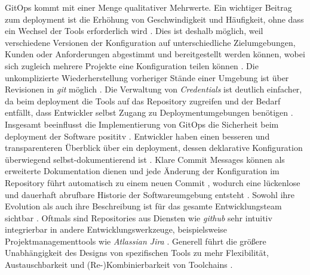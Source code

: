GitOps kommt mit einer Menge qualitativer Mehrwerte. Ein wichtiger Beitrag zum \Gls{deployment} ist die Erhöhung von Geschwindigkeit und Häufigkeit, ohne dass ein Wechsel der Tools erforderlich wird \cite{008:GitOps-Approach-to-Cloud-Cluster-System-Deployment,109:GitOps}. Dies ist deshalb möglich, weil verschiedene Versionen der Konfiguration auf unterschiedliche Zielumgebungen, Kunden oder Anforderungen abgestimmt und bereitgestellt werden können, wobei sich zugleich mehrere Projekte eine Konfiguration teilen können \cite{008:GitOps-Approach-to-Cloud-Cluster-System-Deployment}. Die unkomplizierte Wiederherstellung vorheriger Stände einer Umgebung ist über Revisionen in \textit{\Gls{git}} möglich \cite{008:GitOps-Approach-to-Cloud-Cluster-System-Deployment,010:Efficient-Application-Deployment-GitOps-for-Faster-and-Secure-CI-CD-Cycles,109:GitOps}. Die Verwaltung von \textit{Credentials} ist deutlich einfacher, da beim \Gls{deployment} die Tools auf das Repository zugreifen \cite{008:GitOps-Approach-to-Cloud-Cluster-System-Deployment,109:GitOps} und der Bedarf entfällt, dass Entwickler selbst Zugang zu Deploymentumgebungen benötigen \cite{010:Efficient-Application-Deployment-GitOps-for-Faster-and-Secure-CI-CD-Cycles}. Insgesamt beeinflusst die Implementierung von GitOps die Sicherheit beim \Gls{deployment} der Software posititv \cite{008:GitOps-Approach-to-Cloud-Cluster-System-Deployment,010:Efficient-Application-Deployment-GitOps-for-Faster-and-Secure-CI-CD-Cycles,109:GitOps}. Entwickler haben einen besseren und transparenteren Überblick über ein \Gls{deployment}, dessen deklarative Konfiguration überwiegend selbst-dokumentierend ist \cite{008:GitOps-Approach-to-Cloud-Cluster-System-Deployment,109:GitOps}. Klare Commit Messages können als erweiterte Dokumentation dienen \cite{008:GitOps-Approach-to-Cloud-Cluster-System-Deployment} und jede Änderung der Konfiguration im Repository führt automatisch zu einem neuen Commit \cite{010:Efficient-Application-Deployment-GitOps-for-Faster-and-Secure-CI-CD-Cycles}, wodurch eine lückenlose und dauerhaft abrufbare Historie der Softwareumgebung entsteht \cite{008:GitOps-Approach-to-Cloud-Cluster-System-Deployment,010:Efficient-Application-Deployment-GitOps-for-Faster-and-Secure-CI-CD-Cycles,109:GitOps}. Sowohl ihre Evolution als auch ihre Beschreibung ist für das gesamte Entwicklungsteam sichtbar \cite{109:GitOps}. Oftmals sind Repositories aus Diensten wie \textit{\Gls{github}} sehr intuitiv integrierbar in andere Entwicklungswerkzeuge, beispielsweise Projektmanagementtools wie \textit{Atlassian Jira} \cite{008:GitOps-Approach-to-Cloud-Cluster-System-Deployment}. Generell führt die größere Unabhängigkeit des Designs von spezifischen Tools zu mehr Flexibilität, Austauschbarkeit und (Re-)Kombinierbarkeit von Toolchains \cite{010:Efficient-Application-Deployment-GitOps-for-Faster-and-Secure-CI-CD-Cycles}.

